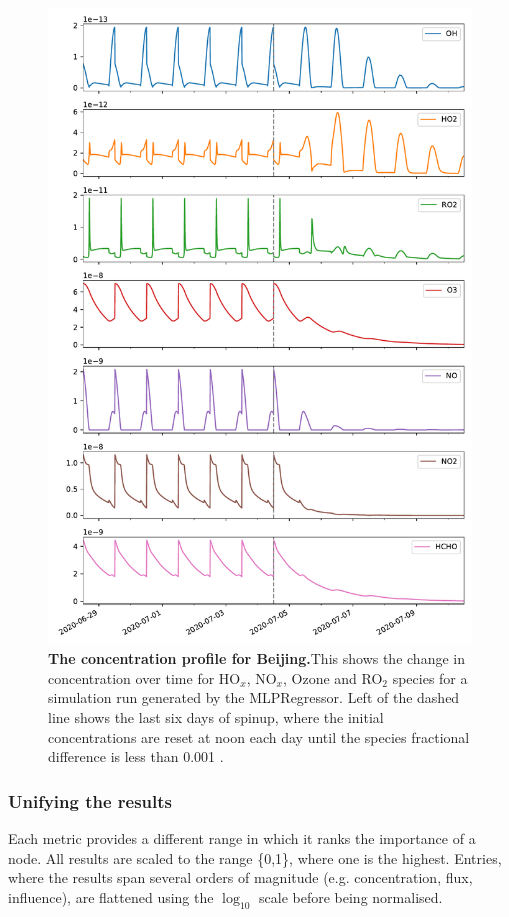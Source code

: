 \begin{figure}[H]
    \centering
\includegraphics[width=.9\textwidth]{figures_c3/mlpregressor/conc_beijing.pdf}
\caption{\textbf{The concentration profile for Beijing.}This shows the change in concentration over time for HO$_x$, NO$_x$, Ozone and RO$_2$ species for a simulation run generated by the MLPRegressor. Left of the dashed line shows the last six days of spinup, where the initial concentrations are reset at noon each day until the species fractional difference is less than 0.001 .}\label{fig:cbeijing}
\end{figure}

\newpage





\subsubsection{Unifying the results}
Each metric provides a different range in which it ranks the importance of a node. All results are scaled to the range \{0,1\}, where one is the highest. Entries, where the results span several orders of magnitude (e.g. concentration, flux, influence), are flattened using the $\log_{10}$ scale before being normalised. 



